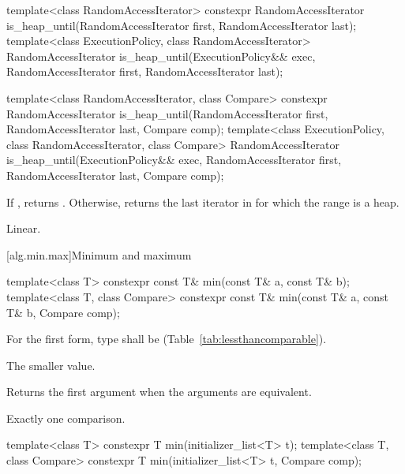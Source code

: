 %
\begin{itemdecl}
template<class RandomAccessIterator>
  constexpr RandomAccessIterator
    is_heap_until(RandomAccessIterator first, RandomAccessIterator last);
template<class ExecutionPolicy, class RandomAccessIterator>
  RandomAccessIterator
    is_heap_until(ExecutionPolicy&& exec,
                  RandomAccessIterator first, RandomAccessIterator last);

template<class RandomAccessIterator, class Compare>
  constexpr RandomAccessIterator
    is_heap_until(RandomAccessIterator first, RandomAccessIterator last,
                  Compare comp);
template<class ExecutionPolicy, class RandomAccessIterator, class Compare>
  RandomAccessIterator
    is_heap_until(ExecutionPolicy&& exec,
                  RandomAccessIterator first, RandomAccessIterator last,
                  Compare comp);
\end{itemdecl}


\begin{itemdescr}
\pnum
\returns If , returns
. Otherwise, returns
the last iterator  in  for which the
range  is a heap.

\pnum
\complexity Linear.
\end{itemdescr}


[alg.min.max]{Minimum and maximum}

%
\begin{itemdecl}
template<class T> constexpr const T& min(const T& a, const T& b);
template<class T, class Compare>
  constexpr const T& min(const T& a, const T& b, Compare comp);
\end{itemdecl}

\begin{itemdescr}
\pnum
\requires
For the first form, type  shall be
 (Table~\ref{tab:lessthancomparable}).

\pnum
\returns
The smaller value.

\pnum
\remarks
Returns the first argument when the arguments are equivalent.

\pnum
\complexity
Exactly one comparison.
\end{itemdescr}

%
\begin{itemdecl}
template<class T>
  constexpr T min(initializer_list<T> t);
template<class T, class Compare>
  constexpr T min(initializer_list<T> t, Compare comp);
\end{itemdecl}

